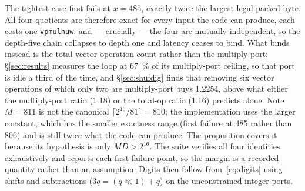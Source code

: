\documentclass[11pt,a4paper]{article}
\newcommand{\code}[1]{\texttt{#1}}
\begin{document}
The tightest case first fails at $x=485$, exactly twice the largest legal packed
byte. All four quotients are therefore exact for every input the code can
produce, each costs one \code{vpmulhuw}, and --- crucially --- the four are
mutually independent, so the depth-five chain collapses to depth one and latency
ceases to bind. What binds instead is the total vector-operation count rather
than the multiply port: \S\ref{sec:results} measures the loop at
\SI{67}{\percent} of its multiply-port ceiling, so that port is idle a third of
the time, and \S\ref{sec:shufdig} finds that removing six vector operations of
which only two are multiply-port buys \num{1.2254}, above what either the
multiply-port ratio (\num{1.18}) or the total-op ratio (\num{1.16}) predicts
alone. Note $M=811$ is not the
canonical $\lceil 2^{16}/81\rceil=810$; the implementation uses the larger
constant, which has the smaller exactness range (first failure at \num{485}
rather than \num{806}) and is still twice what the code can produce. The
proposition covers it because its hypothesis is only $MD>2^{16}$. The suite
verifies all four identities exhaustively and reports each first-failure point,
so the margin is a recorded quantity rather than an assumption.
Digits then follow from~\eqref{eq:digits} using shifts and subtractions
($3q=(q\ll 1)+q$) on the unconstrained integer ports.
\end{document}
